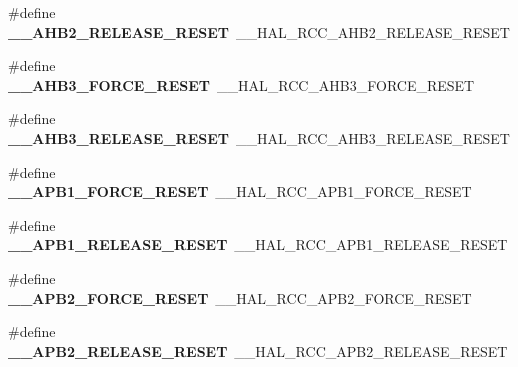 \begin{DoxyCompactItemize}
\item 
\mbox{\label{group___h_a_l___r_c_c___aliased_ga9757b88e34916ad449503457d065b844}} 
\#define {\bfseries \+\_\+\+\_\+\+A\+H\+B2\+\_\+\+R\+E\+L\+E\+A\+S\+E\+\_\+\+R\+E\+S\+ET}~\+\_\+\+\_\+\+H\+A\+L\+\_\+\+R\+C\+C\+\_\+\+A\+H\+B2\+\_\+\+R\+E\+L\+E\+A\+S\+E\+\_\+\+R\+E\+S\+ET
\item 
\mbox{\label{group___h_a_l___r_c_c___aliased_ga967e453f7a2dc917a2f43041bc3530bc}} 
\#define {\bfseries \+\_\+\+\_\+\+A\+H\+B3\+\_\+\+F\+O\+R\+C\+E\+\_\+\+R\+E\+S\+ET}~\+\_\+\+\_\+\+H\+A\+L\+\_\+\+R\+C\+C\+\_\+\+A\+H\+B3\+\_\+\+F\+O\+R\+C\+E\+\_\+\+R\+E\+S\+ET
\item 
\mbox{\label{group___h_a_l___r_c_c___aliased_gacf2ccc00726b7722836cddb8f42db97c}} 
\#define {\bfseries \+\_\+\+\_\+\+A\+H\+B3\+\_\+\+R\+E\+L\+E\+A\+S\+E\+\_\+\+R\+E\+S\+ET}~\+\_\+\+\_\+\+H\+A\+L\+\_\+\+R\+C\+C\+\_\+\+A\+H\+B3\+\_\+\+R\+E\+L\+E\+A\+S\+E\+\_\+\+R\+E\+S\+ET
\item 
\mbox{\label{group___h_a_l___r_c_c___aliased_gad52dd8358580ee80c5d66fb0ae3208fa}} 
\#define {\bfseries \+\_\+\+\_\+\+A\+P\+B1\+\_\+\+F\+O\+R\+C\+E\+\_\+\+R\+E\+S\+ET}~\+\_\+\+\_\+\+H\+A\+L\+\_\+\+R\+C\+C\+\_\+\+A\+P\+B1\+\_\+\+F\+O\+R\+C\+E\+\_\+\+R\+E\+S\+ET
\item 
\mbox{\label{group___h_a_l___r_c_c___aliased_ga497e83304224dd4740b388fe296beaf0}} 
\#define {\bfseries \+\_\+\+\_\+\+A\+P\+B1\+\_\+\+R\+E\+L\+E\+A\+S\+E\+\_\+\+R\+E\+S\+ET}~\+\_\+\+\_\+\+H\+A\+L\+\_\+\+R\+C\+C\+\_\+\+A\+P\+B1\+\_\+\+R\+E\+L\+E\+A\+S\+E\+\_\+\+R\+E\+S\+ET
\item 
\mbox{\label{group___h_a_l___r_c_c___aliased_ga92a0e6fcc37827864d686e5d023d8472}} 
\#define {\bfseries \+\_\+\+\_\+\+A\+P\+B2\+\_\+\+F\+O\+R\+C\+E\+\_\+\+R\+E\+S\+ET}~\+\_\+\+\_\+\+H\+A\+L\+\_\+\+R\+C\+C\+\_\+\+A\+P\+B2\+\_\+\+F\+O\+R\+C\+E\+\_\+\+R\+E\+S\+ET
\item 
\mbox{\label{group___h_a_l___r_c_c___aliased_ga68340225a9f3449d73f454972cf01726}} 
\#define {\bfseries \+\_\+\+\_\+\+A\+P\+B2\+\_\+\+R\+E\+L\+E\+A\+S\+E\+\_\+\+R\+E\+S\+ET}~\+\_\+\+\_\+\+H\+A\+L\+\_\+\+R\+C\+C\+\_\+\+A\+P\+B2\+\_\+\+R\+E\+L\+E\+A\+S\+E\+\_\+\+R\+E\+S\+ET

\end{DoxyCompactItemize}
